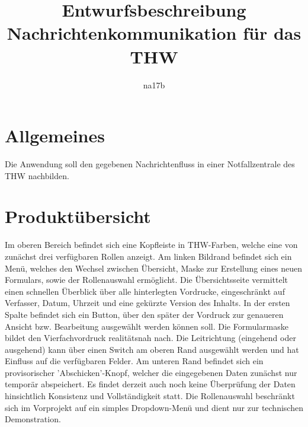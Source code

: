 \documentclass[a4paper,11pt,oneside, titlepage]{article}
\title{Entwurfsbeschreibung\\Nachrichtenkommunikation für das THW}
\author{na17b}
\date{}
\begin{document}
\maketitle


\tableofcontents


\newpage


\section{Allgemeines}
Die Anwendung soll den gegebenen Nachrichtenfluss in einer Notfallzentrale des THW nachbilden.
\section{Produktübersicht}
Im oberen Bereich befindet sich eine Kopfleiste in THW-Farben, welche eine von zunächst drei verfügbaren Rollen anzeigt. Am linken Bildrand befindet sich ein Menü, welches den Wechsel zwischen Übersicht, Maske zur Erstellung eines neuen Formulars, sowie der Rollenauswahl ermöglicht. Die Übersichtsseite vermittelt einen schnellen Überblick über alle hinterlegten Vordrucke, eingeschränkt auf Verfasser, Datum, Uhrzeit und eine gekürzte Version des Inhalts. In der ersten Spalte befindet sich ein Button, über den später der Vordruck zur genaueren Ansicht bzw. Bearbeitung ausgewählt werden können soll. Die Formularmaske bildet den Vierfachvordruck realitätsnah nach. Die Leitrichtung (eingehend oder ausgehend) kann über einen Switch am oberen Rand ausgewählt werden und hat Einfluss auf die verfügbaren Felder. Am unteren Rand befindet sich ein provisorischer 'Abschicken'-Knopf, welcher die eingegebenen Daten zunächst nur temporär abspeichert. Es findet derzeit auch noch keine Überprüfung der Daten hinsichtlich Konsistenz und Vollständigkeit statt. Die Rollenauswahl beschränkt sich im Vorprojekt auf ein simples Dropdown-Menü und dient nur zur technischen Demonstration.
\end{document}
